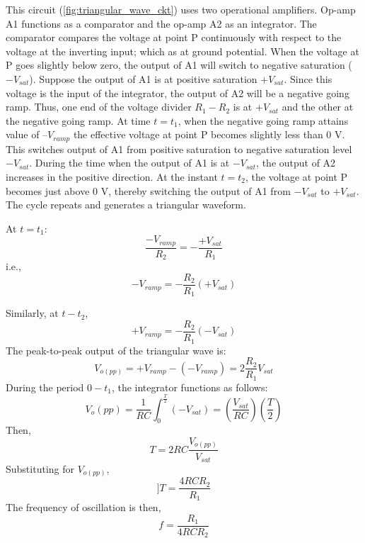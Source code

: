 This circuit (\ref{fig:triangular_wave_ckt}) uses two operational amplifiers. Op-amp A1 functions as a comparator and the op-amp A2 as an integrator. The comparator compares the voltage at point P
continuously with respect to the voltage at the inverting input; which as at ground potential. When the voltage at P goes slightly below zero, the output of A1 will switch to negative
saturation ($-V_{sat}$). Suppose the output of A1 is at positive saturation $+V_{sat}$. Since this voltage is the input of the integrator, the output of A2 will be a negative going ramp. Thus, one end of the voltage divider $R_1-R_2$ is at $+V_{sat}$ and the other at the negative going ramp. At time $t = t_1$, when the negative going ramp attains value of $–V_{ramp}$ the effective voltage at point P becomes slightly less than 0 V. This switches output of A1 from positive saturation to negative saturation level $-V_{sat}$. During the time when the output of A1 is at $-V_{sat}$, the output of A2 increases in the positive direction. At the instant $t = t_2$, the voltage at point P becomes just above
0 V, thereby switching the output of A1 from $-V_{sat}$ to $+V_{sat}$. The cycle repeats and generates a triangular waveform.


At $t=t_1$:
\[
\dfrac{-V_{ramp}}{R_2} = -\dfrac{+V_{sat}}{R_1}
\]
i.e., 
\[
-V_{ramp}=-\dfrac{R_2}{R_1}\left(+V_{sat}\right)
\]

Similarly, at $t-t_2$,
\[
+V_{ramp}=-\dfrac{R_2}{R_1}\left(-V_{sat}\right)
\]
The peak-to-peak output of the triangular wave is:
\[
V_{o(pp)}=+V_{ramp}-\left(-V_{ramp}\right)=2\dfrac{R_2}{R_1}V_{sat}
\]
During the period $0-t_1$, the integrator functions as follows:
\[
V_o(pp) = \dfrac{1}{RC}\int_0^\frac{T}{2}\left(-V_{sat}\right) =\left(\dfrac{V_{sat}}{RC}\right)\left(\dfrac{T}{2}\right)
\]
Then,
\[
T=2RC\dfrac{V_{o(pp)}}{V_{sat}}
\]
Substituting for $V_{o(pp)}$, 
\[]
T=\dfrac{4RCR_2}{R_1}
\]
The frequency of oscillation is then,
\[
f=\dfrac{R_1}{4RCR_2}
\]
%
